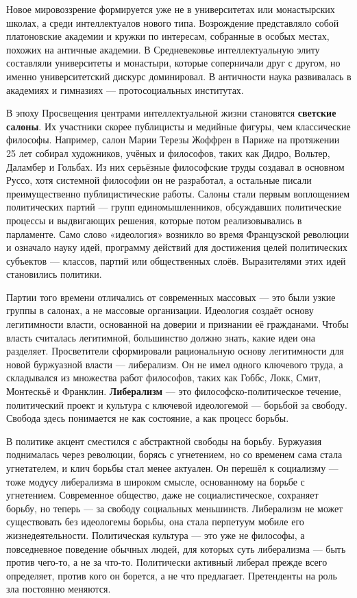 Новое мировоззрение формируется уже не в университетах или монастырских школах, а среди интеллектуалов нового типа. Возрождение представляло собой платоновские академии и кружки по интересам, собранные в особых местах, похожих на античные академии. В Средневековье интеллектуальную элиту составляли университеты и монастыри, которые соперничали друг с другом, но именно университетский дискурс доминировал. В античности наука развивалась в академиях и гимназиях --- протосоциальных институтах.

В эпоху Просвещения центрами интеллектуальной жизни становятся \textbf{светские салоны}. Их участники скорее публицисты и медийные фигуры, чем классические философы. Например, салон Марии Терезы Жоффрен в Париже на протяжении 25 лет собирал художников, учёных и философов, таких как Дидро, Вольтер, Даламбер и Гольбах. Из них серьёзные философские труды создавал в основном Руссо, хотя системной философии он не разработал, а остальные писали преимущественно публицистические работы. Салоны стали первым воплощением политических партий --- групп единомышленников, обсуждавших политические процессы и выдвигающих решения, которые потом реализовывались в парламенте. Само слово «идеология» возникло во время Французской революции и означало науку идей, программу действий для достижения целей политических субъектов --- классов, партий или общественных слоёв. Выразителями этих идей становились политики.

Партии того времени отличались от современных массовых --- это были узкие группы в салонах, а не массовые организации. Идеология создаёт основу легитимности власти, основанной на доверии и признании её гражданами. Чтобы власть считалась легитимной, большинство должно знать, какие идеи она разделяет. Просветители сформировали рациональную основу легитимности для новой буржуазной власти --- либерализм. Он не имел одного ключевого труда, а складывался из множества работ философов, таких как Гоббс, Локк, Смит, Монтескьё и Франклин. \textbf{Либерализм} --- это философско-политическое течение, политический проект и культура с ключевой идеологемой --- борьбой за свободу. Свобода здесь понимается не как состояние, а как процесс борьбы.

В политике акцент сместился с абстрактной свободы на борьбу. Буржуазия поднималась через революции, борясь с угнетением, но со временем сама стала угнетателем, и клич борьбы стал менее актуален. Он перешёл к социализму --- тоже модусу либерализма в широком смысле, основанному на борьбе с угнетением.
Современное общество, даже не социалистическое, сохраняет борьбу, но теперь --- за свободу социальных меньшинств. Либерализм не может существовать без идеологемы борьбы, она стала перпетуум мобиле его жизнедеятельности.
Политическая культура --- это уже не философы, а повседневное поведение обычных людей, для которых суть либерализма --- быть против чего-то, а не за что-то. Политически активный либерал прежде всего определяет, против кого он борется, а не что предлагает. Претенденты на роль зла постоянно меняются.


